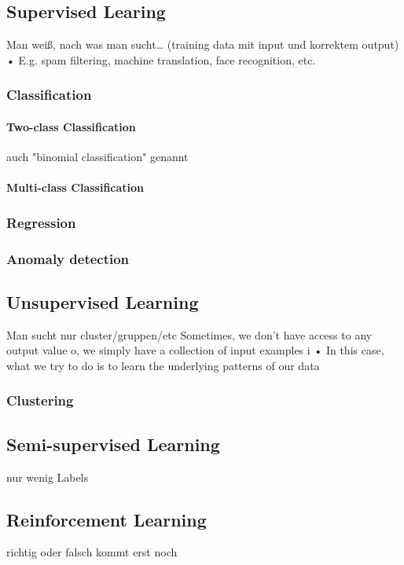 \subsection{Supervised Learing}
Man weiß, nach was man sucht… (training data mit input und korrektem output)
• E.g. spam filtering, machine translation, face recognition, etc.
\subsubsection{Classification}
\paragraph{Two-class Classification}
auch "binomial classification"\citep{ericson_how_2017} genannt
\paragraph{Multi-class Classification}
\subsubsection{Regression}
\subsubsection{Anomaly detection}



\subsection{Unsupervised Learning}
Man sucht nur cluster/gruppen/etc
Sometimes, we don’t have access to any
output value o, we simply have a
collection of input examples i
• In this case, what we try to do is to learn
the underlying patterns of our data
\subsubsection{Clustering}


\subsection{Semi-supervised Learning}
nur wenig Labels


\subsection{Reinforcement Learning}
richtig oder falsch kommt erst noch


